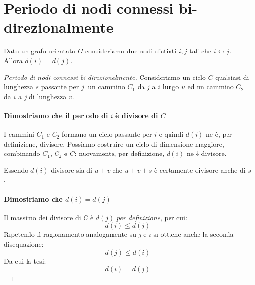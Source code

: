 \documentclass[\main/main.tex]{subfiles}
\begin{document}
\section{Periodo di nodi connessi bi-direzionalmente}
\begin{theorem}
  Dato un grafo orientato \(G\) consideriamo due nodi distinti \(i,j\) tali che \(i \leftrightarrow j\). Allora \(d(i) = d(j)\).
\end{theorem}
\begin{proof}[Periodo di nodi connessi bi-direzionalmente]
  Consideriamo un ciclo \(C\) qualsiasi di lunghezza \(s\) passante per \(j\), un cammino \(C_1\) da \(j\) a \(i\) lungo \(u\) ed un cammino \(C_2\) da \(i\) a \(j\) di lunghezza \(v\).

  \paragraph*{Dimostriamo che il periodo di \(i\) è divisore di \(C\)}
  I cammini \(C_1\) e \(C_2\) formano un ciclo passante per \(i\) e quindi \(d(i)\) ne è, per definizione, divisore. Possiamo costruire un ciclo di dimensione maggiore, combinando \(C_1\), \(C_2\) e \(C\): nuovamente, per definizione, \(d(i)\) ne è divisore.

  Essendo \(d(i)\) divisore sia di \(u+v\) che \(u+v+s\) è certamente divisore anche di \(s\).

  \paragraph*{Dimostriamo che \(d(i)=d(j)\)}
  Il massimo dei divisore di \(C\) è \(d(j)\) \textit{per definizione}, per cui:
  \[
    d(i) \leq d(j)
  \]
  Ripetendo il ragionamento analogamente su \(j\) e \(i\) si ottiene anche la seconda disequazione:
  \[
    d(j) \leq d(i)
  \]
  Da cui la tesi:
  \[
    d(i) = d(j)
  \]
\end{proof}
\end{document}
